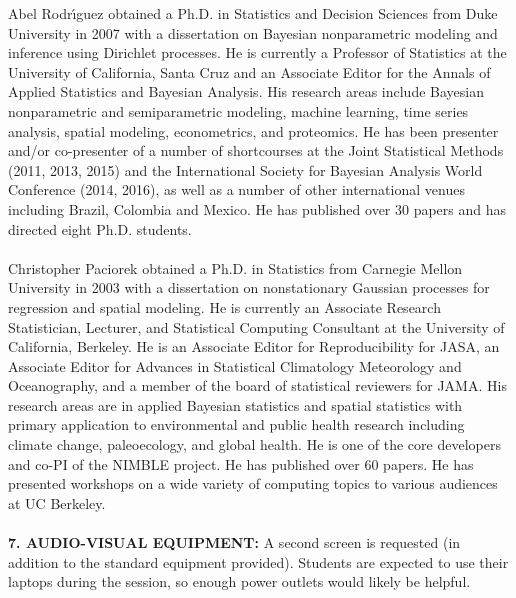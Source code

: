 \documentclass[11pt]{article}
\begin{document}
Abel Rodr\'{\i}guez obtained a Ph.D. in Statistics and Decision Sciences from Duke University in 2007 with a dissertation on Bayesian nonparametric modeling and inference using Dirichlet processes. He is currently a  Professor of Statistics at the University of California, Santa Cruz and an Associate Editor for the Annals of Applied Statistics and Bayesian Analysis. His research areas include Bayesian nonparametric and semiparametric modeling, machine learning, time series analysis, spatial modeling, econometrics, and proteomics.  He has been presenter and/or co-presenter of a number of shortcourses at the Joint Statistical Methods (2011, 2013, 2015) and the International Society for Bayesian Analysis World Conference (2014, 2016), as well as a number of other international venues including Brazil, Colombia and Mexico. He has published over 30 papers and has directed eight Ph.D. students.
\\
\\
Christopher Paciorek obtained a Ph.D. in Statistics from Carnegie Mellon University in 2003 with a dissertation on nonstationary Gaussian processes for regression and spatial modeling. He is currently an Associate Research Statistician, Lecturer, and Statistical Computing Consultant at the University of California, Berkeley. He is an Associate Editor for Reproducibility for JASA, an Associate Editor for Advances in Statistical Climatology Meteorology and Oceanography, and a member of the board of statistical reviewers for JAMA. His research areas are in applied Bayesian statistics and spatial statistics with primary application to environmental and public health research including climate change, paleoecology, and global health. He is one of the core developers and co-PI of the NIMBLE project. He has published over 60 papers. He has presented workshops on a wide variety of computing topics to various audiences at UC Berkeley. 
\\
\\
{\large {\bf 7. AUDIO-VISUAL EQUIPMENT:}} A second screen is requested (in addition to the standard equipment provided).  Students are expected to use their laptops during the session, so enough power outlets would likely be helpful.
\end{document}
